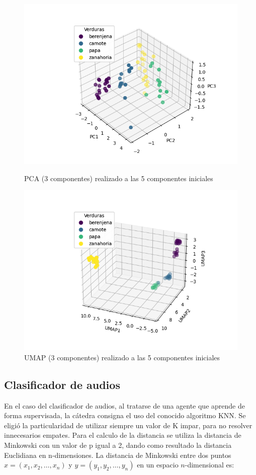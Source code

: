 \documentclass[12pt,a4paper]{article}
\begin{document}
\begin{figure}[htbp]
    \centering
    \begin{minipage}{0.8\textwidth}
        \centering
            \includegraphics[width=0.85\linewidth]{Figure_1.png}
            \caption{PCA (3 componentes) realizado a las 5 componentes iniciales}
            \label{fig:pca_img}
    \end{minipage}\hfill
    \begin{minipage}{0.8\textwidth}
         \centering
    \includegraphics[width=0.85\linewidth]{umap_imagenes.png}
    \caption{UMAP (3 componentes) realizado a las 5 componentes iniciales}
    \label{fig:umap_img}
    \end{minipage}
\end{figure}
\subsection{Clasificador de audios}
En el caso del clasificador de audios, al tratarse de una agente que aprende de forma supervisada, la cátedra consigna el uso del conocido algoritmo KNN. \newline
Se eligió la particularidad de utilizar siempre un valor de K impar, para no resolver innecesarios empates.\newline
Para el calculo de la distancia se utiliza la distancia de Minkowski con un valor de p igual a 2, dando como resultado la distancia Euclidiana en n-dimensiones.\newline
La distancia de Minkowski entre dos puntos \( x = (x_1, x_2, \dots, x_n) \) y \( y = (y_1, y_2, \dots, y_n) \) en un espacio \( n \)-dimensional es:
\end{document}
